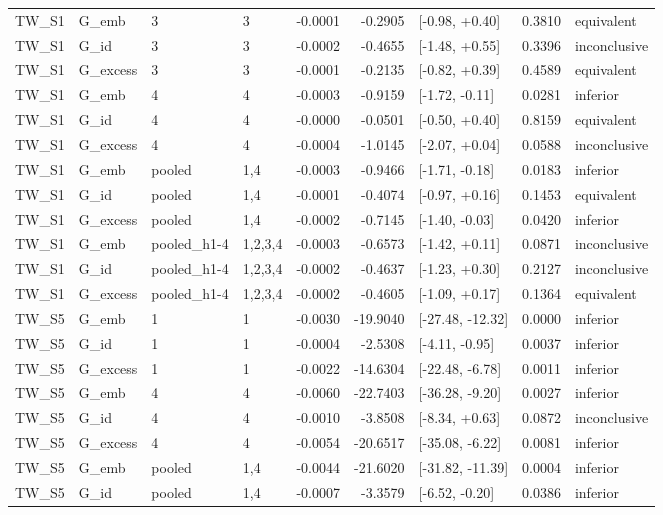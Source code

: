 \begin{tabular}{llllrrlrl}
TW\_S1 & G\_emb & 3 & 3 & -0.0001 & -0.2905 & [-0.98, +0.40] & 0.3810 & equivalent \\
TW\_S1 & G\_id & 3 & 3 & -0.0002 & -0.4655 & [-1.48, +0.55] & 0.3396 & inconclusive \\
TW\_S1 & G\_excess & 3 & 3 & -0.0001 & -0.2135 & [-0.82, +0.39] & 0.4589 & equivalent \\
TW\_S1 & G\_emb & 4 & 4 & -0.0003 & -0.9159 & [-1.72, -0.11] & 0.0281 & inferior \\
TW\_S1 & G\_id & 4 & 4 & -0.0000 & -0.0501 & [-0.50, +0.40] & 0.8159 & equivalent \\
TW\_S1 & G\_excess & 4 & 4 & -0.0004 & -1.0145 & [-2.07, +0.04] & 0.0588 & inconclusive \\
TW\_S1 & G\_emb & pooled & 1,4 & -0.0003 & -0.9466 & [-1.71, -0.18] & 0.0183 & inferior \\
TW\_S1 & G\_id & pooled & 1,4 & -0.0001 & -0.4074 & [-0.97, +0.16] & 0.1453 & equivalent \\
TW\_S1 & G\_excess & pooled & 1,4 & -0.0002 & -0.7145 & [-1.40, -0.03] & 0.0420 & inferior \\
TW\_S1 & G\_emb & pooled\_h1-4 & 1,2,3,4 & -0.0003 & -0.6573 & [-1.42, +0.11] & 0.0871 & inconclusive \\
TW\_S1 & G\_id & pooled\_h1-4 & 1,2,3,4 & -0.0002 & -0.4637 & [-1.23, +0.30] & 0.2127 & inconclusive \\
TW\_S1 & G\_excess & pooled\_h1-4 & 1,2,3,4 & -0.0002 & -0.4605 & [-1.09, +0.17] & 0.1364 & equivalent \\
TW\_S5 & G\_emb & 1 & 1 & -0.0030 & -19.9040 & [-27.48, -12.32] & 0.0000 & inferior \\
TW\_S5 & G\_id & 1 & 1 & -0.0004 & -2.5308 & [-4.11, -0.95] & 0.0037 & inferior \\
TW\_S5 & G\_excess & 1 & 1 & -0.0022 & -14.6304 & [-22.48, -6.78] & 0.0011 & inferior \\
TW\_S5 & G\_emb & 4 & 4 & -0.0060 & -22.7403 & [-36.28, -9.20] & 0.0027 & inferior \\
TW\_S5 & G\_id & 4 & 4 & -0.0010 & -3.8508 & [-8.34, +0.63] & 0.0872 & inconclusive \\
TW\_S5 & G\_excess & 4 & 4 & -0.0054 & -20.6517 & [-35.08, -6.22] & 0.0081 & inferior \\
TW\_S5 & G\_emb & pooled & 1,4 & -0.0044 & -21.6020 & [-31.82, -11.39] & 0.0004 & inferior \\
TW\_S5 & G\_id & pooled & 1,4 & -0.0007 & -3.3579 & [-6.52, -0.20] & 0.0386 & inferior \\

\end{tabular}
